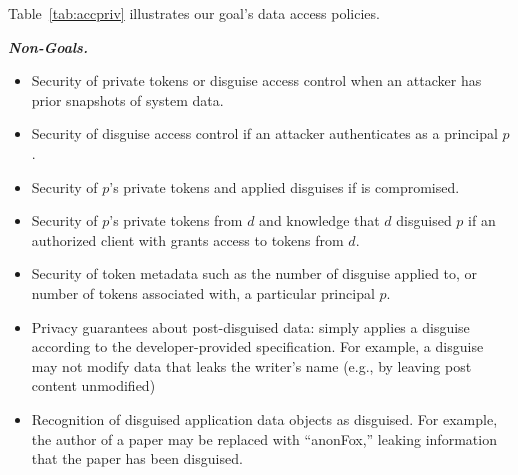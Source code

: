 \vspace{6pt}\noindent
Table~\ref{tab:accpriv} illustrates our goal's data access policies.

\vspace{6pt}\noindent\textbf{\emph{Non-Goals.}}
\begin{itemize}
    \item Security of private tokens or disguise access control when an attacker has prior snapshots of system data.
    \item Security of disguise access control if an attacker authenticates as a principal $p$.
    \item Security of $p$'s private tokens and applied disguises if  is compromised.  
    \item Security of $p$'s private tokens from $d$ and knowledge that $d$ disguised $p$ if an authorized client with  grants \sys access to tokens from $d$. 
    \item Security of token metadata such as the number of disguise applied to, or number of tokens associated with, a particular principal $p$.
    \item Privacy guarantees about post-disguised data: \sys simply
        applies a disguise according to the developer-provided specification.  For example, a
        disguise may not modify data that leaks the writer's name (e.g., by leaving post content
        unmodified)
    \item Recognition of disguised application data objects as disguised. For example, the author of a
        paper may be replaced with ``anonFox,'' leaking information that the paper has been
        disguised.
\end{itemize}
